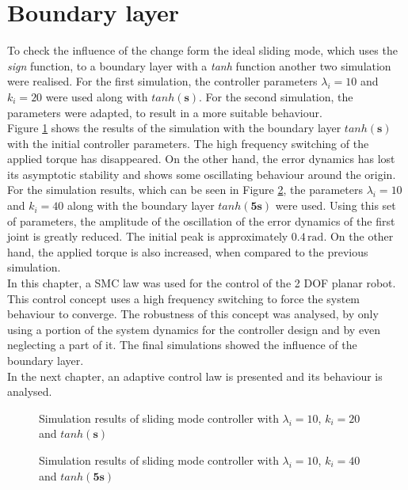 \section{Boundary layer}
To check the influence of the change form the ideal sliding mode, which uses the \textit{sign} function, to a boundary layer with a \textit{tanh} function another two simulation were realised. For the first simulation, the controller parameters $\lambda_i = 10$ and $k_i = 20$ were used along with $tanh(\mathbf{s})$. For the second simulation, the parameters were adapted, to result in a more suitable behaviour.\\
Figure \ref{fig:ch6_sim6} shows the results of the simulation with the boundary layer $tanh(\mathbf{s})$ with the initial controller parameters. The high frequency switching of the applied torque has disappeared. On the other hand, the error dynamics has lost its asymptotic stability and shows some oscillating behaviour around the origin.\\
For the simulation results, which can be seen in Figure \ref{fig:ch6_sim7}, the parameters $\lambda_i = 10$ and $k_i = 40$ along with the boundary layer $tanh(\mathbf{5s})$ were used. Using this set of parameters, the amplitude of the oscillation of the error dynamics of the first joint is greatly reduced. The initial peak is approximately $0.4\,\mathrm{rad}$. On the other hand, the applied torque is also increased, when compared to the previous simulation.\\
In this chapter, a \ac{SMC} law was used for the control of the 2 \ac{DOF} planar robot. This control concept uses a high frequency switching to force the system behaviour to converge. The robustness of this concept was analysed, by only using a portion of the system dynamics for the controller design and by even neglecting a part of it. The final simulations showed the influence of the boundary layer.\\
In the next chapter, an adaptive control law is presented and its behaviour is analysed.
\begin{figure}[H]
	\centering
	
	\caption{Simulation results of sliding mode controller with $\lambda_i = 10$, $k_i = 20$ and $tanh(\mathbf{s})$}
	\label{fig:ch6_sim6}
\end{figure}
\begin{figure}[H]
	\centering
	
	\caption{Simulation results of sliding mode controller with $\lambda_i = 10$, $k_i = 40$ and $tanh(\mathbf{5s})$}
	\label{fig:ch6_sim7}
\end{figure}